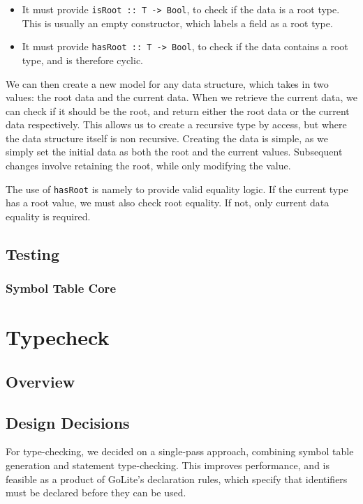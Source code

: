 \documentclass[11pt]{article}
\begin{document}
\begin{itemize}
	\item It must provide \texttt{isRoot :: T -> Bool}, to check if the data is a root type. This is usually an empty constructor, which labels a field as a root type.
	\item It must provide \texttt{hasRoot :: T -> Bool}, to check if the data contains a root type, and is therefore cyclic.
\end{itemize}

We can then create a new model for any data structure, which takes in two values: the root data and the current data.
When we retrieve the current data, we can check if it should be the root, and return either the root data or the current data respectively.
This allows us to create a recursive type by access, but where the data structure itself is non recursive.
Creating the data is simple, as we simply set the initial data as both the root and the current values.
Subsequent changes involve retaining the root, while only modifying the value.

The use of \texttt{hasRoot} is namely to provide valid equality logic.
If the current type has a root value, we must also check root equality.
If not, only current data equality is required.

\subsection{Testing} %

\subsubsection{Symbol Table Core}
\label{sec:test-symbol-table-core}
\section{Typecheck}
\subsection{Overview}
\subsection{Design Decisions}
For type-checking, we decided on a single-pass approach, combining
symbol table generation and statement type-checking. This improves
performance, and is feasible as a product of GoLite's declaration
rules, which specify that identifiers must be declared before they can
be used.
\end{document}
